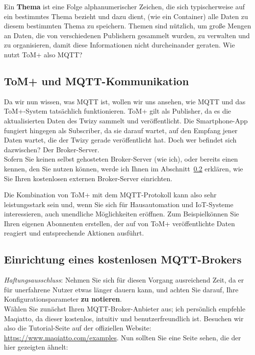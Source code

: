 Ein \textbf{Thema} ist eine Folge alphanumerischer Zeichen, die sich typischerweise auf ein bestimmtes
Thema bezieht und dazu dient, (wie ein Container) alle Daten zu diesem bestimmten
Thema zu speichern. Themen sind nützlich, um große Mengen an Daten, die von verschiedenen
Publishern gesammelt wurden, zu verwalten und zu organisieren, damit diese Informationen nicht durcheinander geraten. Wie nutzt ToM+ also MQTT?

\subsection{ToM+ und MQTT-Kommunikation}

Da wir nun wissen, was MQTT ist, wollen wir uns ansehen, wie MQTT und das ToM+-System tatsächlich funktionieren.
ToM+ gilt als Publisher, da es die aktualisierten Daten des Twizy sammelt und veröffentlicht.
Die Smartphone-App fungiert hingegen als Subscriber, da sie darauf wartet,
auf den Empfang jener Daten wartet, die der Twizy gerade veröffentlicht hat. Doch wer befindet sich dazwischen? Der Broker-Server.\\

Sofern Sie keinen selbst gehosteten Broker-Server (wie ich), oder bereits einen kennen, den Sie nutzen können, werde ich
Ihnen im Abschnitt~\ref{sec:free_broker} erklären, wie Sie Ihren kostenlosen externen Broker-Server einrichten.


Die Kombination von ToM+ mit dem MQTT-Protokoll kann also sehr leistungsstark sein und, wenn Sie sich für
Hausautomation und IoT-Systeme interessieren, auch unendliche Möglichkeiten eröffnen. Zum Beispielkönnen Sie
Ihren eigenen Abonnenten erstellen, der auf von ToM+ veröffentlichte Daten reagiert und entsprechende Aktionen ausführt.\\

\subsection{Einrichtung eines kostenlosen MQTT-Brokers}
\label{sec:free_broker}

\textit{Haftungsausschluss}: Nehmen Sie sich für diesen Vorgang ausreichend Zeit, da er für unerfahrene Nutzer
etwas länger dauern kann, und achten Sie darauf, Ihre Konfigurationsparameter \textbf{zu notieren}.\\

Wählen Sie zunächst Ihren MQTT-Broker-Anbieter aus; ich persönlich empfehle Maqiatto, da
dieser kostenlos, intuitiv und benutzerfreundlich ist. Besuchen wir also die Tutorial-Seite auf der offiziellen Website:
\url{https://www.maqiatto.com/examples}. Nun sollten Sie eine Seite sehen, die der hier gezeigten ähnelt:

